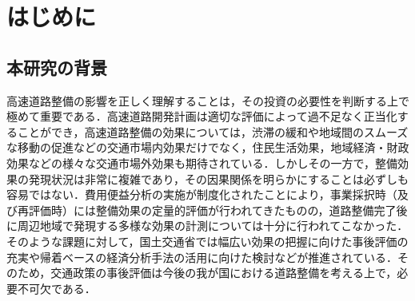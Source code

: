 \chapter{はじめに}

\section{本研究の背景}

高速道路整備の影響を正しく理解することは，その投資の必要性を判断する上で極めて重要である．高速道路開発計画は適切な評価によって過不足なく正当化することができ，高速道路整備の効果については，渋滞の緩和や地域間のスムーズな移動の促進などの交通市場内効果だけでなく，住民生活効果，地域経済・財政効果などの様々な交通市場外効果も期待されている．しかしその一方で，整備効果の発現状況は非常に複雑であり，その因果関係を明らかにすることは必ずしも容易ではない．費用便益分析の実施が制度化されたことにより，事業採択時（及び再評価時）には整備効果の定量的評価が行われてきたものの，道路整備完了後に周辺地域で発現する多様な効果の計測については十分に行われてこなかった．そのような課題に対して，国土交通省では幅広い効果の把握に向けた事後評価の充実や帰着ベースの経済分析手法の活用に向けた検討などが推進されている．そのため，交通政策の事後評価は今後の我が国における道路整備を考える上で，必要不可欠である．

